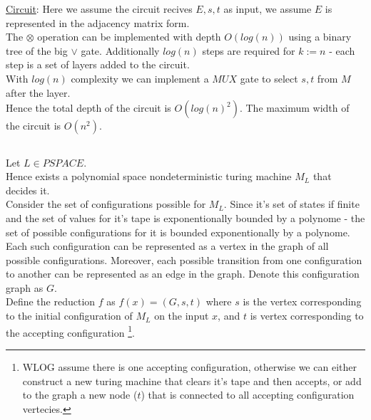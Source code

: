 \underline{Circuit}:
Here we assume the circuit recives $E,s,t$ as input, we assume $E$ is represented
in the adjacency matrix form.\\
The $\otimes$ operation can be implemented with depth $O(log(n))$
using a binary tree of the big $\vee$ gate.
Additionally $log(n)$ steps are required for $k:=n$ - each step
is a set of layers added to the circuit.\\
With $log(n)$ complexity we can implement a $MUX$ gate
to select $s,t$ from $M$ after the layer.\\
Hence the total depth of the circuit is $O(log(n)^2)$.
The maximum width of the circuit is $O(n^2)$.

\subsection{}
Let $L\in PSPACE$.\\
Hence exists a polynomial space nondeterministic turing machine $M_L$ that decides it.\\
Consider the set of configurations possible for $M_L$.
Since it's set of states if finite and the set of values for
it's tape is exponentionally bounded by a polynome - 
the set of possible configurations for it is bounded
exponentionally by a polynome.\\

Each such configuration can be represented as a vertex
in the graph of all possible configurations.
Moreover, each possible transition from one configuration to another
can be represented as an edge in the graph.
Denote this configuration graph as $G$.\\

Define the reduction $f$ as $f(x)=(G, s, t)$
where $s$ is the vertex corresponding to the initial
configuration of $M_L$ on the input $x$, and $t$
is vertex corresponding to the accepting configuration
\footnote{
	WLOG assume there is one accepting configuration,
	otherwise we can either construct a new turing
	machine that clears it's tape and then accepts,
	or add to the graph a new node ($t$) that
	is connected to all accepting configuration vertecies.
}.